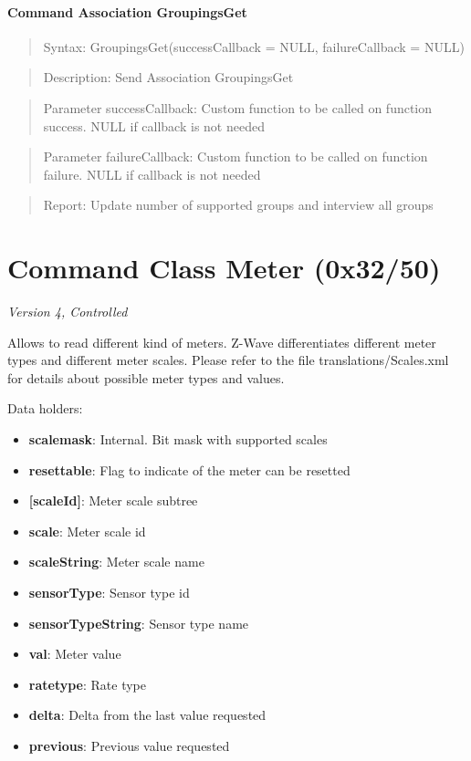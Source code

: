 \paragraph{Command Association GroupingsGet}
\begin{quote}Syntax: GroupingsGet(successCallback = NULL, failureCallback = NULL)\end{quote}
\begin{quote}Description: Send Association GroupingsGet\end{quote}
\begin{quote}Parameter successCallback: Custom function to be called on function success. NULL if callback is not needed\end{quote}
\begin{quote}Parameter failureCallback: Custom function to be called on function failure. NULL if callback is not needed\end{quote}
\begin{quote}Report: Update number of supported groups and interview all groups\end{quote}


\section{Command Class Meter (0x32/50)}

\textit{Version 4, Controlled}
\newline

Allows to read different kind of meters. Z-Wave differentiates different meter types and different meter scales. Please refer to the file translations/Scales.xml for details about possible meter types and values.
\newline

\noindent
Data holders:

\begin{itemize}
\item \textbf{scalemask}: Internal. Bit mask with supported scales
\item \textbf{resettable}: Flag to indicate of the meter can be resetted
\item \textbf{[scaleId]}: Meter scale subtree
\item \qquad\textbf{scale}: Meter scale id
\item \qquad\textbf{scaleString}: Meter scale name
\item \qquad\textbf{sensorType}: Sensor type id
\item \qquad\textbf{sensorTypeString}: Sensor type name
\item \qquad\textbf{val}: Meter value
\item \qquad\textbf{ratetype}: Rate type
\item \qquad\textbf{delta}: Delta from the last value requested
\item \qquad\textbf{previous}: Previous value requested
\end{itemize}

